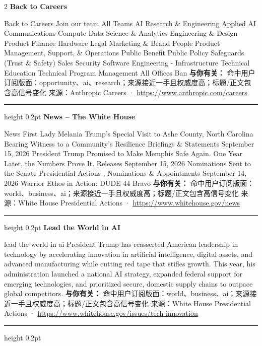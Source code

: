 \documentclass[10.5pt]{ctexart}
\begin{document}
\begin{multicols}{2}
{\large\bfseries Back to Careers}\par
Back to Careers Join our team All Teams AI Research \& Engineering Applied AI Communications Compute Data Science \& Analytics Engineering \& Design - Product Finance Hardware Legal Marketing \& Brand People Product Management, Support, \& Operations Public Benefit Public Policy Safeguards (Trust \& Safety) Sales Security Software Engineering - Infrastructure Technical Education Technical Program Management All Offices Ban
\textbf{与你有关：} 命中用户订阅版面：opportunity、ai、research；来源接近一手且权威度高；标题/正文包含高信号变化
{\footnotesize\color{ormuted} 来源：Anthropic Careers · \url{https://www.anthropic.com/careers}}
\vspace{2mm}
\hrule height 0.2pt
\vspace{2mm}
{\large\bfseries News – The White House}\par
News First Lady Melania Trump’s Special Visit to Ashe County, North Carolina Bearing Witness to a Community’s Resilience Briefings \& Statements September 15, 2026 President Trump Promised to Make Memphis Safe Again. One Year Later, the Numbers Prove It. Releases September 15, 2026 Nominations Sent to the Senate Presidential Actions , Nominations \& Appointments September 14, 2026 Warrior Ethos in Action: DUDE 44 Bravo
\textbf{与你有关：} 命中用户订阅版面：world、business、ai；来源接近一手且权威度高；标题/正文包含高信号变化
{\footnotesize\color{ormuted} 来源：White House Presidential Actions · \url{https://www.whitehouse.gov/news}}
\vspace{2mm}
\hrule height 0.2pt
\vspace{2mm}
{\large\bfseries Lead the World in AI}\par
lead the world in ai President Trump has reasserted American leadership in technology by accelerating innovation in artificial intelligence, digital assets, and advanced manufacturing while cutting red tape that stifles growth. This year, his administration launched a national AI strategy, expanded federal support for emerging technologies, and prioritized secure, domestic supply chains to outpace global competitors.
\textbf{与你有关：} 命中用户订阅版面：world、business、ai；来源接近一手且权威度高；标题/正文包含高信号变化
{\footnotesize\color{ormuted} 来源：White House Presidential Actions · \url{https://www.whitehouse.gov/issues/tech-innovation}}
\vspace{2mm}
\hrule height 0.2pt
\vspace{2mm}

\end{multicols}
\end{document}
